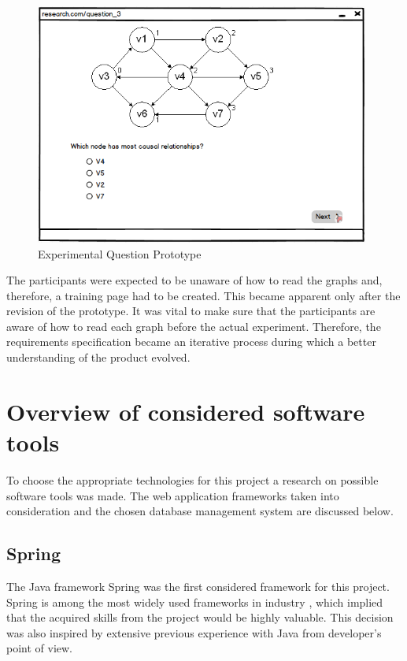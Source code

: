 \documentclass{l4proj}
\begin{document}
\begin{figure}[H]
\centering
\includegraphics[width=11cm]{researchQuestion.PNG}
\caption{Experimental Question Prototype}
\label{researchQuestion}
\end{figure}
 
The participants were expected to be unaware of how to read the graphs and, therefore, a training page had to be created. This became apparent only after the revision of the prototype. It was vital to make sure that the participants are aware of how to read each graph before the actual experiment. Therefore, the requirements specification became an iterative process during which a better understanding of the product evolved.

\section{Overview of considered software tools}

To choose the appropriate technologies for this project a research on possible software tools was made. The web application frameworks taken into consideration and the chosen database management system are discussed below. 

\subsection{Spring}

The Java framework Spring was the first considered framework for this project. Spring is among the most widely used frameworks in industry \cite{shiLuiLi}, which implied that the acquired skills from the project would be highly valuable. This decision was also inspired by extensive previous experience with Java from developer's point of view. 
\end{document}
